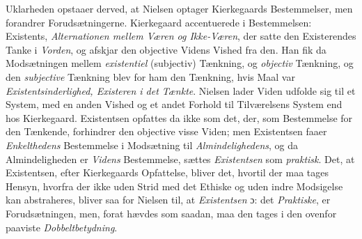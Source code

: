 \documentclass[12pt,a4paper]{book}
\begin{document}
Uklarheden opstaaer derved, at Nielsen optager Kierkegaards Bestemmelser, men forandrer
Forudsætningerne. Kierkegaard accentuerede i Bestemmelsen: Existents, \emph{Alternationen
mellem Væren og Ikke-Væren}, der satte den Existerendes Tanke i \emph{Vorden}, og afskjar den
objective Videns Vished fra den. Han fik da Modsætningen mellem \emph{existentiel} (subjectiv) Tænkning, og \emph{objectiv} Tænkning, og den \emph{subjective} Tænkning blev for ham
den Tænkning, hvis Maal var \emph{Existentsinderlighed, Existeren i det Tænkte}. Nielsen
lader Viden udfolde sig til et System, med en anden Vished og et andet Forhold til
Tilværelsens System end hos Kierkegaard. Existentsen opfattes da ikke som det, der, som
Bestemmelse for den Tænkende, forhindrer den objective visse Viden; men Existentsen faaer
\emph{Enkelthedens} Bestemmelse i Modsætning til \emph{Almindelighedens}, og da Almindeligheden er
\emph{Videns} Bestemmelse, sættes \emph{Existentsen} som \emph{praktisk}. Det, at Existentsen, efter
Kierkegaards Opfattelse, bliver det, hvortil der maa tages Hensyn, hvorfra der ikke uden
Strid med det Ethiske og uden indre Modsigelse kan abstraheres, bliver saa for Nielsen til,
at \emph{Existentsen} ɔ: det \emph{Praktiske}, er Forudsætningen, men, forat hævdes som saadan, maa den
tages i den ovenfor paaviste \emph{Dobbeltbetydning}.
\end{document}
